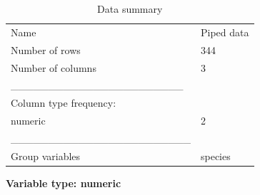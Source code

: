 \documentclass[
  a4paper,
  DIV=11,
  numbers=noendperiod,
  oneside]{scrreprt}
\begin{document}
\begin{longtable}[]{@{}ll@{}}
\caption{Data summary}\tabularnewline
\toprule()
\endhead
Name & Piped data \\
Number of rows & 344 \\
Number of columns & 3 \\
\_\_\_\_\_\_\_\_\_\_\_\_\_\_\_\_\_\_\_\_\_\_\_ & \\
Column type frequency: & \\
numeric & 2 \\
\_\_\_\_\_\_\_\_\_\_\_\_\_\_\_\_\_\_\_\_\_\_\_\_ & \\
Group variables & species \\
\bottomrule()
\end{longtable}

\textbf{Variable type: numeric}
\end{document}
